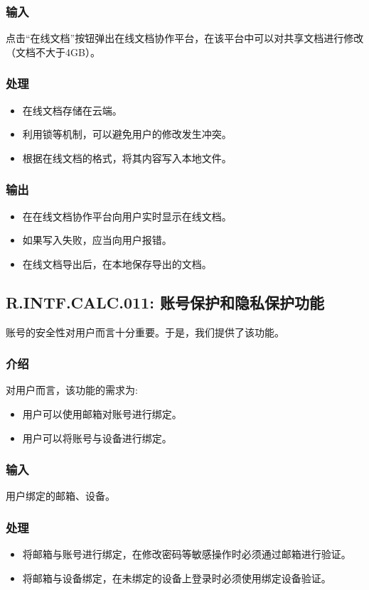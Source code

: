 \subsubsection{输入}
点击“在线文档”按钮弹出在线文档协作平台，在该平台中可以对共享文档进行修改（文档不大于4GB）。
\subsubsection{处理}
\begin{itemize}
  \item 在线文档存储在云端。
  \item 利用锁等机制，可以避免用户的修改发生冲突。
  \item 根据在线文档的格式，将其内容写入本地文件。
\end{itemize}
\subsubsection{输出}
\begin{itemize}
  \item 在在线文档协作平台向用户实时显示在线文档。
  \item 如果写入失败，应当向用户报错。
  \item 在线文档导出后，在本地保存导出的文档。
\end{itemize}

\subsection{R.INTF.CALC.011: 账号保护和隐私保护功能}
账号的安全性对用户而言十分重要。于是，我们提供了该功能。
\subsubsection{介绍}
对用户而言，该功能的需求为:
\begin{itemize}
  \item 用户可以使用邮箱对账号进行绑定。
  \item 用户可以将账号与设备进行绑定。
\end{itemize}
\subsubsection{输入}
用户绑定的邮箱、设备。
\subsubsection{处理}
\begin{itemize}
  \item 将邮箱与账号进行绑定，在修改密码等敏感操作时必须通过邮箱进行验证。
  \item 将邮箱与设备绑定，在未绑定的设备上登录时必须使用绑定设备验证。
\end{itemize}
